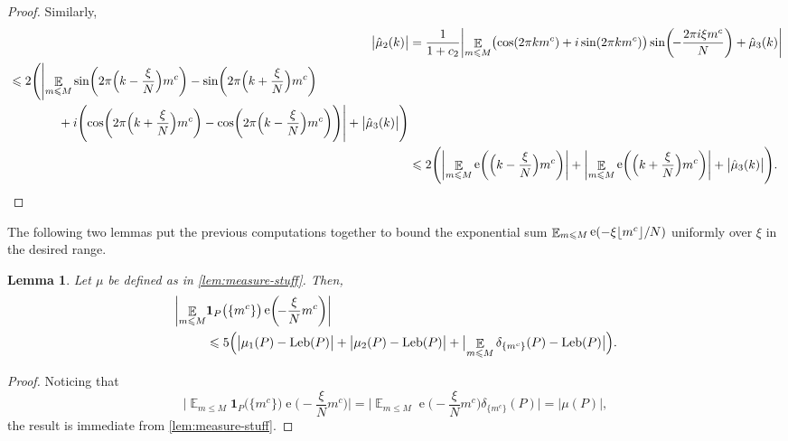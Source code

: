 \documentclass[letterpaper, 12pt]{article}
\theoremstyle{plain}
\newtheorem{Lemma}[Theorem]{Lemma}
\theoremstyle{definition}
\theoremstyle{plain}
\theoremstyle{plain}
\numberwithin{equation}{section}
\renewcommand{\leq}{\leqslant}
\newcommand{\E}{\mathbb{E}}
\newcommand{\1}{\textbf{1}}
\DeclarePairedDelimiter\floor{\lfloor}{\rfloor}
\DeclareMathOperator{\Leb}{Leb}
\DeclareMathOperator{\e}{e}
\begin{document}
\begin{proof}
Similarly, \begin{align*}
    \bigl\lvert \hat{\mu}_2(k) \bigr\rvert &= \frac{1}{1 + c_2} \biggl\lvert \mathop{\E}_{m \leq M} \bigl(\cos(2\pi km^c) + i \sin(2\pi k m^c) \bigr)
    \sin\biggl(\! -\frac{2\pi i \xi m^c}{N} \biggr) + \hat{\mu}_3(k) \biggr\rvert\\
    \begin{split}
        &\leq 2\Biggl(\Biggl\lvert\mathop{\E}_{m \leq M} \sin\biggl(2\pi \Bigl(k - \frac{\xi}{N} \Bigr)m^c \biggr)
        - \sin\biggr(2\pi \Bigl(k + \frac{\xi}{N} \Bigr)m^c \biggr)\\
        &\qquad\qquad + i \Biggl(\cos\biggl(2\pi \Bigl(k + \frac{\xi}{N} \Bigr) m^c \biggr) - \cos\biggl(2\pi \Bigl(k - \frac{\xi}{N} \Bigr)m^c \biggr)\Biggr) \Biggr\rvert 
        + \bigl\lvert \hat{\mu}_3(k) \bigr\rvert \Biggr)
    \end{split}\\ 
    &\leq 2 \Biggl(\biggl\lvert\mathop{\E}_{m \leq M} \e\biggl(\Bigl(k - \frac{\xi}{N} \Bigr) m^c \biggr) \biggr\rvert 
    + \biggl\lvert\mathop{\E}_{m \leq M} \e\biggl(\Bigl(k + \frac{\xi}{N}\Bigr)m^c \biggr) \biggr\rvert 
    + \bigl\lvert \hat{\mu}_3(k) \bigr\rvert \Biggr).
\end{align*}
\end{proof}

The following two lemmas put the previous computations together to bound the exponential sum $\mathop{\E}_{m \leq M} \e(-\xi \floor{m^c}/N)$ uniformly over $\xi$ in the desired range.

\begin{Lemma}\label{lem:expectation-to-measure}
    Let $\mu$ be defined as in \cref{lem:measure-stuff}. Then,
    \begin{equation}\label{eqn:turan-prep}
        \begin{split}
             \biggl\lvert \mathop{\E}_{m \leq M} &\1_{P}\bigl(\{m^c\}\bigr) \e\biggl(\! -\frac{\xi}{N} m^c \biggr) \biggr\rvert\\
             &\leq 5\Bigl(\bigl\lvert \mu_1(P) - \Leb(P) \bigr\rvert + \bigl\lvert \mu_2(P) - \Leb(P) \bigr\rvert + \bigl\lvert \mathop{\E}_{m \leq M} \delta_{\{m^c\}}(P) - \Leb(P) \bigr\rvert \Bigr).
         \end{split}
     \end{equation}
\end{Lemma}
\begin{proof}
    Noticing that
    \begin{equation*}
         \biggl\lvert \mathop{\E}_{m \leq M} \1_{P}\bigl(\{m^c\}\bigr) \e\biggl(\! -\frac{\xi}{N} m^c \biggr) \biggr\rvert 
         = \biggl\lvert \mathop{\E}_{m \leq M} \e\biggl(\! -\frac{\xi}{N} m^c \biggr) \delta_{\{m^c\}}(P) \biggr\rvert 
         = \bigl\lvert \mu(P) \bigr\rvert,
     \end{equation*} 
     the result is immediate from \cref{lem:measure-stuff}.
\end{proof}
\end{document}
